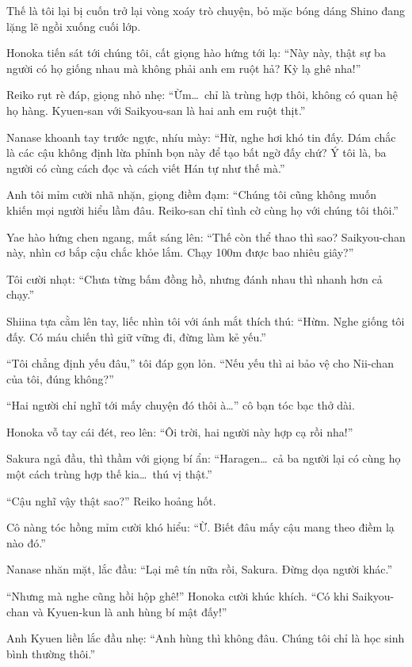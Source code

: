 \documentclass[../main.tex]{subfiles}
\begin{document}
Thế là tôi lại bị cuốn trở lại vòng xoáy trò chuyện, bỏ mặc bóng dáng Shino đang lặng lẽ ngồi xuống cuối lớp.

Honoka tiến sát tới chúng tôi, cất giọng hào hứng tới lạ: ``Này này, thật sự ba người có họ giống nhau mà không phải anh em ruột hả? Kỳ lạ ghê nha!''

Reiko rụt rè đáp, giọng nhỏ nhẹ: ``Ừm\dots\ chỉ là trùng hợp thôi, không có quan hệ họ hàng. Kyuen-san với Saikyou-san là hai anh em ruột thịt.''

Nanase khoanh tay trước ngực, nhíu mày: ``Hừ, nghe hơi khó tin đấy. Dám chắc là các cậu không định lừa phỉnh bọn này để tạo bất ngờ đấy chứ? Ý tôi là, ba người có cùng cách đọc và cách viết Hán tự như thế mà.''

Anh tôi mỉm cười nhã nhặn, giọng điềm đạm: ``Chúng tôi cũng không muốn khiến mọi người hiểu lầm đâu. Reiko-san chỉ tình cờ cùng họ với chúng tôi thôi.''

Yae hào hứng chen ngang, mắt sáng lên: ``Thế còn thể thao thì sao? Saikyou-chan này, nhìn cơ bắp cậu chắc khỏe lắm. Chạy 100m được bao nhiêu giây?''

Tôi cười nhạt: ``Chưa từng bấm đồng hồ, nhưng đánh nhau thì nhanh hơn cả chạy.''

Shiina tựa cằm lên tay, liếc nhìn tôi với ánh mắt thích thú: ``Hừm. Nghe giống tôi đấy. Có máu chiến thì giữ vững đi, đừng làm kẻ yếu.''

``Tôi chẳng định yếu đâu,'' tôi đáp gọn lỏn. ``Nếu yếu thì ai bảo vệ cho Nii-chan của tôi, đúng không?''

``Hai người chỉ nghĩ tới mấy chuyện đó thôi à\dots'' cô bạn tóc bạc thở dài.

Honoka vỗ tay cái đét, reo lên: ``Ôi trời, hai người này hợp cạ rồi nha!''

Sakura ngả đầu, thì thầm với giọng bí ẩn: ``Haragen\dots\ cả ba người lại có cùng họ một cách trùng hợp thế kia\dots\ thú vị thật.''

``Cậu nghĩ vậy thật sao?'' Reiko hoảng hốt.

Cô nàng tóc hồng mỉm cười khó hiểu: ``Ừ. Biết đâu mấy cậu mang theo điềm lạ nào đó.''

Nanase nhăn mặt, lắc đầu: ``Lại mê tín nữa rồi, Sakura. Đừng dọa người khác.''

``Nhưng mà nghe cũng hồi hộp ghê!'' Honoka cười khúc khích. ``Có khi Saikyou-chan và Kyuen-kun là anh hùng bí mật đấy!''

Anh Kyuen liền lắc đầu nhẹ: ``Anh hùng thì không đâu. Chúng tôi chỉ là học sinh bình thường thôi.''
\end{document}
